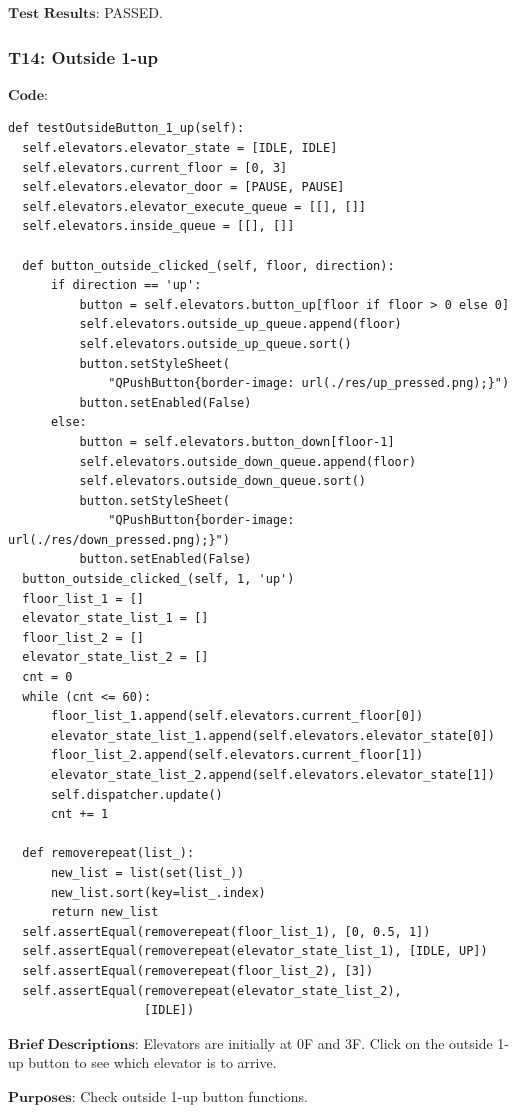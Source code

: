 \documentclass{article}
\begin{document}
$\textbf{Test Results:}$
PASSED.

\subsubsection*{T14: Outside 1-up}
$\textbf{Code:}$
\begin{lstlisting}
def testOutsideButton_1_up(self):
  self.elevators.elevator_state = [IDLE, IDLE]
  self.elevators.current_floor = [0, 3]
  self.elevators.elevator_door = [PAUSE, PAUSE]
  self.elevators.elevator_execute_queue = [[], []]
  self.elevators.inside_queue = [[], []]

  def button_outside_clicked_(self, floor, direction):
      if direction == 'up':
          button = self.elevators.button_up[floor if floor > 0 else 0]
          self.elevators.outside_up_queue.append(floor)
          self.elevators.outside_up_queue.sort()
          button.setStyleSheet(
              "QPushButton{border-image: url(./res/up_pressed.png);}")
          button.setEnabled(False)
      else:
          button = self.elevators.button_down[floor-1]
          self.elevators.outside_down_queue.append(floor)
          self.elevators.outside_down_queue.sort()
          button.setStyleSheet(
              "QPushButton{border-image: url(./res/down_pressed.png);}")
          button.setEnabled(False)
  button_outside_clicked_(self, 1, 'up')
  floor_list_1 = []
  elevator_state_list_1 = []
  floor_list_2 = []
  elevator_state_list_2 = []
  cnt = 0
  while (cnt <= 60):
      floor_list_1.append(self.elevators.current_floor[0])
      elevator_state_list_1.append(self.elevators.elevator_state[0])
      floor_list_2.append(self.elevators.current_floor[1])
      elevator_state_list_2.append(self.elevators.elevator_state[1])
      self.dispatcher.update()
      cnt += 1

  def removerepeat(list_):
      new_list = list(set(list_))
      new_list.sort(key=list_.index)
      return new_list
  self.assertEqual(removerepeat(floor_list_1), [0, 0.5, 1])
  self.assertEqual(removerepeat(elevator_state_list_1), [IDLE, UP])
  self.assertEqual(removerepeat(floor_list_2), [3])
  self.assertEqual(removerepeat(elevator_state_list_2),
                   [IDLE])
\end{lstlisting}

$\textbf{Brief Descriptions:}$
Elevators are initially at 0F and 3F. Click on the outside 1-up button to see which elevator is to arrive.

$\textbf{Purposes:}$
Check outside 1-up button functions.
\end{document}
